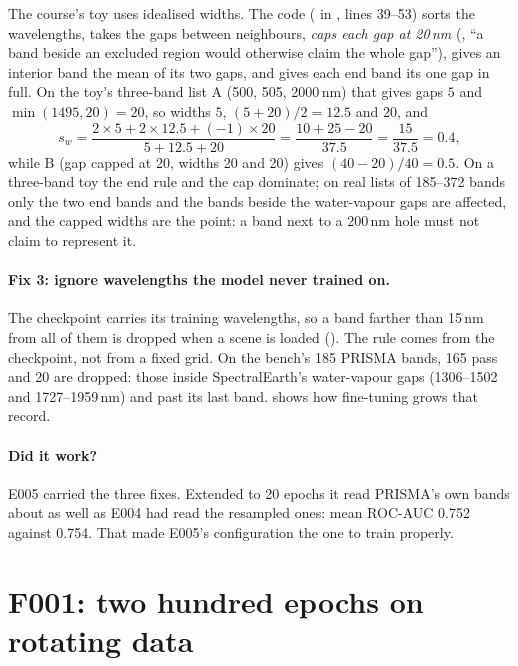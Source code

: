 \begin{sourcenote}
The course's toy uses idealised widths. The code ( in
, lines 39--53) sorts the wavelengths, takes the gaps between
neighbours, \emph{caps each gap at 20\,nm} (, ``a band beside an excluded region would otherwise claim the
whole gap''), gives an interior band the mean of its two gaps, and gives each end band its one gap in full. On the toy's
three-band list A (500, 505, 2000\,nm) that gives gaps $5$ and $\min(1495, 20) = 20$, so widths $5$, $(5+20)/2 = 12.5$ and
$20$, and
\[
  s_w = \frac{2\times 5 + 2\times 12.5 + (-1)\times 20}{5 + 12.5 + 20} = \frac{10 + 25 - 20}{37.5} = \frac{15}{37.5} = 0.4,
\]
while B (gap capped at 20, widths 20 and 20) gives $(40 - 20)/40 = 0.5$. On a three-band toy the end rule and the cap
dominate; on real lists of 185--372 bands only the two end bands and the bands beside the water-vapour gaps are affected,
and the capped widths are the point: a band next to a 200\,nm hole must not claim to represent it.
\end{sourcenote}

\paragraph{Fix 3: ignore wavelengths the model never trained on.} The checkpoint carries its training wavelengths, so a
band farther than 15\,nm from all of them is dropped when a scene is loaded (). The rule comes from
the checkpoint, not from a fixed grid. On the bench's 185 PRISMA bands, 165 pass and 20 are dropped: those inside
SpectralEarth's water-vapour gaps (1306--1502 and 1727--1959\,nm) and past its last band.  shows how
fine-tuning grows that record.

\paragraph{Did it work?} E005 carried the three fixes. Extended to 20 epochs it read PRISMA's own bands about as well as E004
had read the resampled ones: mean ROC-AUC 0.752 against 0.754.\tbrk{}
That made E005's configuration the one to train properly.

\section{F001: two hundred epochs on rotating data}\label{sec:pretrain:f001}

